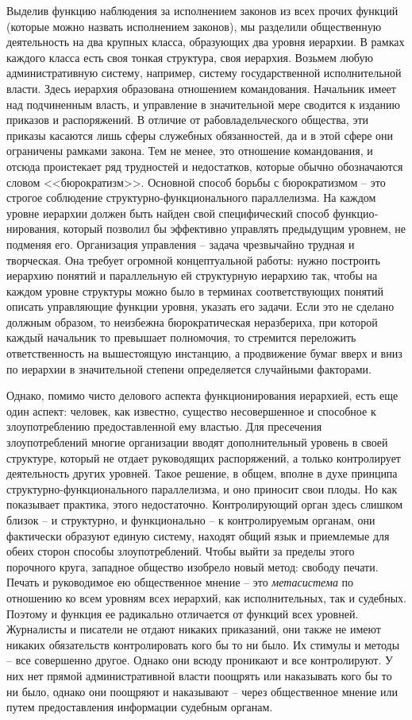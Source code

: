 \documentclass{book}
\begin{document}
Выделив функцию наблюдения за исполнением законов из всех прочих функций (которые можно назвать исполнением законов), мы разделили общественную деятельность на два крупных класса, образующих два уровня иерархии. В рамках каждого класса есть своя тонкая структура, своя иерархия. Возьмем любую административную систему, например, си­стему государственной исполнительной власти. Здесь иерархия образована отношением командования. Начальник имеет над подчиненным власть, и управление в значительной мере сво­дится к изданию приказов и распоряжений. В отличие от рабо­владельческого общества, эти приказы касаются лишь сферы служебных обязанностей, да и в этой сфере они ограничены рамками закона. Тем не менее, это отношение командования, и отсюда проистекает ряд трудностей и недостатков, которые обычно обозначаются словом <<бюрократизм>>. Основной способ борьбы с бюрократизмом -- это строгое соблюдение структур­но-функционального параллелизма. На каждом уровне иерар­хии должен быть найден свой специфический способ 
функцио­нирования, который позволил бы эффективно управлять преды­дущим уровнем, не подменяя его. Организация управления -- задача чрезвычайно трудная и творческая. Она требует огром­ной концептуальной работы: нужно построить иерархию поня­тий и параллельную ей структурную иерархию так, чтобы на каждом уровне структуры можно было в терминах соответствующих понятий описать управляющие функции уровня, ука­зать его задачи. Если это не сделано должным образом, то неиз­бежна бюрократическая неразбериха, при которой каждый на­чальник то превышает полномочия, то стремится переложить ответственность на вышестоящую инстанцию, а продвижение бумаг вверх и вниз по иерархии в значительной степени опре­деляется случайными факторами.

Однако, помимо чисто делового аспекта функционирования иерархией, есть еще один аспект: человек, как известно, сущест­во несовершенное и способное к злоупотреблению предостав­ленной ему властью. Для пресечения злоупотреблений многие организации вводят дополнительный уровень в своей структу­ре, который не отдает руководящих распоряжений, а только контролирует деятельность других уровней. Такое решение, в общем, вполне в духе принципа структурно-функционально­го параллелизма, и оно приносит свои плоды. Но как показы­вает практика, этого недостаточно. Контролирующий орган здесь слишком близок -- и структурно, и функционально -- к контролируемым органам, они фактически образуют единую систему, находят общий язык и приемлемые для обеих сто­рон способы злоупотреблений. Чтобы выйти за пределы этого порочного круга, западное общество изобрело новый метод: свободу печати. Печать и руководимое ею общественное мнение -- это \textit{метасистема}  по отношению ко всем уровням всех иерархий, как исполнительных, так и судебных. 
Поэтому и функция ее радикально отличается от функций всех уровней. Журналисты и писатели не отдают никаких приказаний, они также не имеют никаких обязательств контролировать кого бы то ни было. Их стимулы и методы -- все совершенно другое. Однако они всюду проникают и все контролируют. У них нет прямой административной власти поощрять или наказывать кого бы то ни было, однако они поощряют и наказывают -- че­рез общественное мнение или путем предоставления информа­ции судебным органам.
\end{document}
